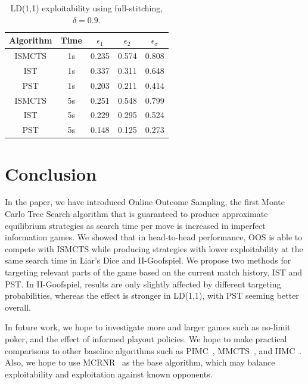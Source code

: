 \documentclass[letterpaper]{article}
\begin{document}
\begin{table}
{\small
\begin{center}
\begin{tabular}{ccccc}
Algorithm     & Time & $\epsilon_1$ & $\epsilon_2$ & $\epsilon_\sigma$ \\
\hline
ISMCTS        & 1s   & 0.235  & 0.574  & 0.808 \\
IST           & 1s   & 0.337  & 0.311  & 0.648 \\
PST           & 1s   & 0.203  & 0.211  & 0.414 \\
\hline
ISMCTS        & 5s   & 0.251  & 0.548  & 0.799 \\
IST           & 5s   & 0.229  & 0.295  & 0.524 \\
PST           & 5s   & 0.148  & 0.125  & 0.273 \\
\hline
\end{tabular}
\caption{LD(1,1) exploitability using full-stitching, $\delta = 0.9$.} 
\label{tbl:fullstitching}
\end{center}
}
\end{table}


\section{Conclusion}

In the paper, we have introduced Online Outcome Sampling, the first Monte Carlo 
Tree Search algorithm that is guaranteed to produce  
approximate equilibrium strategies as search time per move is increased in imperfect information games.
We showed that in head-to-head performance, OOS is able to compete with 
ISMCTS while producing strategies with lower exploitability
at the same search time in Liar's Dice and II-Goofspiel.
We propose two methods for targeting relevant parts of the game based on the current match history, 
IST and PST.
In II-Goofspiel, results are only slightly affected by different targeting probabilities, whereas the
effect is stronger in LD(1,1), with PST seeming better overall.

In future work, we hope to investigate more and larger games such as 
no-limit poker, and the effect of informed playout policies. 
We hope to make practical comparisons to other baseline algorithms such as 
PIMC~\cite{Long10Understanding}, MMCTS~\cite{Auger11Multiple}, and IIMC~\cite{Furtak13Recursive}.
Also, we hope to use MCRNR~\cite{Ponsen11Computing} as the base algorithm, which 
may balance exploitability and exploitation against known opponents.



\end{document}
